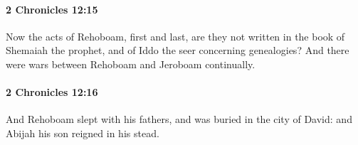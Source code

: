 		\paragraph{2 Chronicles 12:15} %
			\label{2CHRONICLES-12-15}

			Now the acts of Rehoboam, first and last, are they not written in the book of Shemaiah the prophet, and of Iddo the seer concerning genealogies? And there were wars between Rehoboam and Jeroboam continually.


		\paragraph{2 Chronicles 12:16} %
			\label{2CHRONICLES-12-16}

			And Rehoboam slept with his fathers, and was buried in the city of David: and Abijah his son reigned in his stead.

